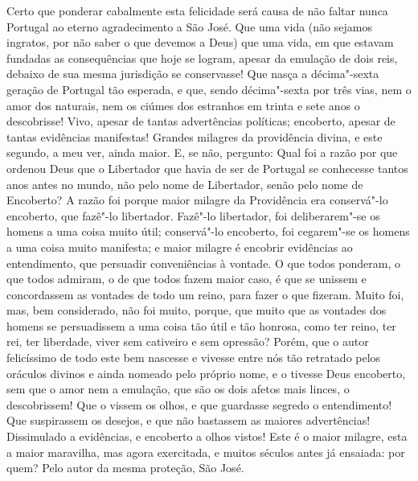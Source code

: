 Certo que ponderar cabalmente esta felicidade será causa de não faltar
nunca Portugal ao eterno agradecimento a São José. Que uma vida (não
sejamos ingratos, por não saber o que devemos a Deus) que uma vida, em
que estavam fundadas as consequências que hoje se logram, apesar da
emulação de dois reis, debaixo de sua mesma jurisdição se conservasse!
Que nasça a décima"-sexta geração de Portugal tão esperada, e que, sendo
décima"-sexta por três vias, nem o amor dos naturais, nem os ciúmes dos
estranhos em trinta e sete anos o descobrisse! Vivo, apesar de tantas
advertências políticas; encoberto, apesar de tantas evidências
manifestas! Grandes milagres da providência divina, e este segundo, a
meu ver, ainda maior. E, se não, pergunto: Qual foi a razão por que
ordenou Deus que o Libertador que havia de ser de Portugal se conhecesse
tantos anos antes no mundo, não pelo nome de Libertador, senão pelo nome
de Encoberto? A razão foi porque maior milagre da Providência era
conservá"-lo encoberto, que fazê"-lo libertador. Fazê"-lo libertador, foi
deliberarem"-se os homens a uma coisa muito útil; conservá"-lo encoberto,
foi cegarem"-se os homens a uma coisa muito manifesta; e maior milagre é
encobrir evidências ao entendimento, que persuadir conveniências à
vontade. O que todos ponderam, o que todos admiram, o de que todos fazem
maior caso, é que se unissem e concordassem as vontades de todo um
reino, para fazer o que fizeram. Muito foi, mas, bem considerado, não
foi muito, porque, que muito que as vontades dos homens se persuadissem
a uma coisa tão útil e tão honrosa, como ter reino, ter rei, ter
liberdade, viver sem cativeiro e sem opressão? Porém, que o autor
felicíssimo de todo este bem nascesse e vivesse entre nós tão retratado
pelos oráculos divinos e ainda nomeado pelo próprio nome, e o tivesse
Deus encoberto, sem que o amor nem a emulação, que são os dois afetos
mais linces, o descobrissem! Que o vissem os olhos, e que guardasse
segredo o entendimento! Que suspirassem os desejos, e que não bastassem
as maiores advertências! Dissimulado a evidências, e encoberto a olhos
vistos! Este é o maior milagre, esta a maior maravilha, mas agora
exercitada, e muitos séculos antes já ensaiada: por quem? Pelo autor da
mesma proteção, São José.

